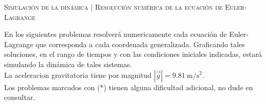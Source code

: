 \documentclass[11pt, spanish, a4paper, twoside]{article}
\begin{document}
\begin{center}
  \textsc{\large Simulación de la dinámica | Resolución numérica de la ecuación de Euler-Lagrange}
\end{center}

\noindent
En los siguientes problemas resolverá numericamente cada ecuación de Euler-Lagrange que corresponda a cada coordenada generalizada.
Graficando tales soluciones, en el rango de tiempos y con las condiciones iniciales indicadas, estará simulando la dinámica de tales sistemas.\\
La aceleracion gravitatoria tiene por magnitud \(|\vec{g}| = \SI{9.81}{\metre\per\second\squared}\).\\
Los problemas marcados con (*) tienen alguna dificultad adicional, no dude en consultar.
\end{document}
